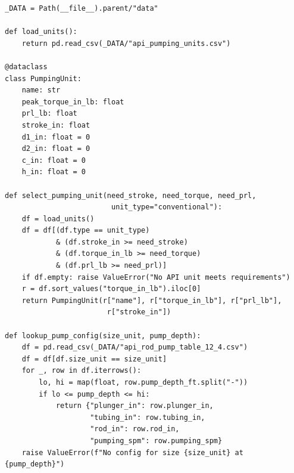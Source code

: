\documentclass[10pt,a4paper,openany]{book}
\begin{document}
\begin{lstlisting}
_DATA = Path(__file__).parent/"data"

def load_units():
    return pd.read_csv(_DATA/"api_pumping_units.csv")

@dataclass
class PumpingUnit:
    name: str
    peak_torque_in_lb: float
    prl_lb: float
    stroke_in: float
    d1_in: float = 0
    d2_in: float = 0
    c_in: float = 0
    h_in: float = 0

def select_pumping_unit(need_stroke, need_torque, need_prl,
                         unit_type="conventional"):
    df = load_units()
    df = df[(df.type == unit_type)
            & (df.stroke_in >= need_stroke)
            & (df.torque_in_lb >= need_torque)
            & (df.prl_lb >= need_prl)]
    if df.empty: raise ValueError("No API unit meets requirements")
    r = df.sort_values("torque_in_lb").iloc[0]
    return PumpingUnit(r["name"], r["torque_in_lb"], r["prl_lb"],
                        r["stroke_in"])

def lookup_pump_config(size_unit, pump_depth):
    df = pd.read_csv(_DATA/"api_rod_pump_table_12_4.csv")
    df = df[df.size_unit == size_unit]
    for _, row in df.iterrows():
        lo, hi = map(float, row.pump_depth_ft.split("-"))
        if lo <= pump_depth <= hi:
            return {"plunger_in": row.plunger_in,
                    "tubing_in": row.tubing_in,
                    "rod_in": row.rod_in,
                    "pumping_spm": row.pumping_spm}
    raise ValueError(f"No config for size {size_unit} at {pump_depth}")
\end{lstlisting}
\end{document}
